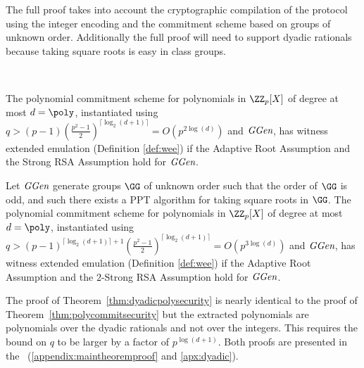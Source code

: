 The full proof takes into account the cryptographic compilation of the protocol using the integer encoding and the commitment scheme based on groups of unknown order. Additionally the full proof will need to support dyadic rationals because taking square roots is easy in class groups.






\newcommand{\maintheorem}{
The polynomial commitment scheme for polynomials in $\ZZ_p[X]$ of degree at most $d=\poly$, instantiated using $q>(p-1)(\frac{p^2-1}{2})^{\lceil \log_2(d+1)\rceil}=O(p^{2\log(d)})$ and $\ggen$, has witness extended emulation (Definition \ref{def:wee}) if the Adaptive Root Assumption and the Strong RSA Assumption hold for $\ggen$.
}
\begin{theorem}~\label{thm:polycommitsecurity} 
	\maintheorem
\end{theorem}


\newcommand{\dyadicmaintheorem}{
Let $\ggen$ generate groups $\GG$ of unknown order such that the order of $\GG$ is odd, and such there exists a PPT algorithm for taking square roots in $\GG$. The polynomial commitment scheme for polynomials in $\ZZ_p[X]$ of degree at most $d=\poly$, instantiated using $q>(p-1)^{\lceil\log_2(d+1)\rceil+1}(\frac{p^2-1}{2})^{\lceil \log_2(d+1)\rceil}=O(p^{3\log(d)})$ and $\ggen$, has witness extended emulation (Definition \ref{def:wee}) if the Adaptive Root Assumption and the  $2$-Strong RSA Assumption hold for $\ggen$.
}
\begin{theorem}
\label{thm:dyadicpolysecurity}	
\dyadicmaintheorem
\end{theorem}
The proof of Theorem~\ref{thm:dyadicpolysecurity} is nearly identical to the proof of Theorem~\ref{thm:polycommitsecurity} but the extracted polynomials are polynomials over the dyadic rationals and not over the integers. This requires the bound on $q$ to be larger by a factor of $p^{\log(d+1)}$. Both proofs are presented in the \appendixphrase~(\ref{appendix:maintheoremproof} and \ref{apx:dyadic}).


